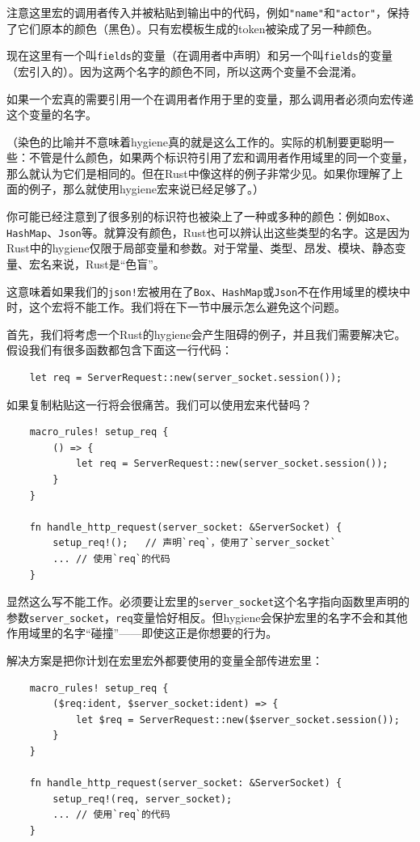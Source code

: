 注意这里宏的调用者传入并被粘贴到输出中的代码，例如\texttt{"name"}和\texttt{"actor"}，保持了它们原本的颜色（黑色）。只有宏模板生成的token被染成了另一种颜色。

现在这里有一个叫\texttt{fields}的变量（在调用者中声明）和另一个叫\texttt{fields}的变量（宏引入的）。因为这两个名字的颜色不同，所以这两个变量不会混淆。

如果一个宏真的需要引用一个在调用者作用于里的变量，那么调用者必须向宏传递这个变量的名字。

（染色的比喻并不意味着hygiene真的就是这么工作的。实际的机制要更聪明一些：不管是什么颜色，如果两个标识符引用了宏和调用者作用域里的同一个变量，那么就认为它们是相同的。但在Rust中像这样的例子非常少见。如果你理解了上面的例子，那么就使用hygiene宏来说已经足够了。）

你可能已经注意到了很多别的标识符也被染上了一种或多种的颜色：例如\texttt{Box}、\texttt{HashMap}、\texttt{Json}等。就算没有颜色，Rust也可以辨认出这些类型的名字。这是因为Rust中的hygiene仅限于局部变量和参数。对于常量、类型、昂发、模块、静态变量、宏名来说，Rust是“色盲”。

这意味着如果我们的\texttt{json!}宏被用在了\texttt{Box}、\texttt{HashMap}或\texttt{Json}不在作用域里的模块中时，这个宏将不能工作。我们将在下一节中展示怎么避免这个问题。

首先，我们将考虑一个Rust的hygiene会产生阻碍的例子，并且我们需要解决它。假设我们有很多函数都包含下面这一行代码：
\begin{verbatim}
    let req = ServerRequest::new(server_socket.session());
\end{verbatim}

如果复制粘贴这一行将会很痛苦。我们可以使用宏来代替吗？
\begin{verbatim}
    macro_rules! setup_req {
        () => {
            let req = ServerRequest::new(server_socket.session());
        }
    }

    fn handle_http_request(server_socket: &ServerSocket) {
        setup_req!();   // 声明`req`，使用了`server_socket`
        ... // 使用`req`的代码
    }
\end{verbatim}

显然这么写不能工作。必须要让宏里的\texttt{server\_socket}这个名字指向函数里声明的参数\texttt{server\_socket}，\texttt{req}变量恰好相反。但hygiene会保护宏里的名字不会和其他作用域里的名字“碰撞”——即使这正是你想要的行为。

解决方案是把你计划在宏里宏外都要使用的变量全部传进宏里：
\begin{verbatim}
    macro_rules! setup_req {
        ($req:ident, $server_socket:ident) => {
            let $req = ServerRequest::new($server_socket.session());
        }
    }

    fn handle_http_request(server_socket: &ServerSocket) {
        setup_req!(req, server_socket);
        ... // 使用`req`的代码
    }
\end{verbatim}

